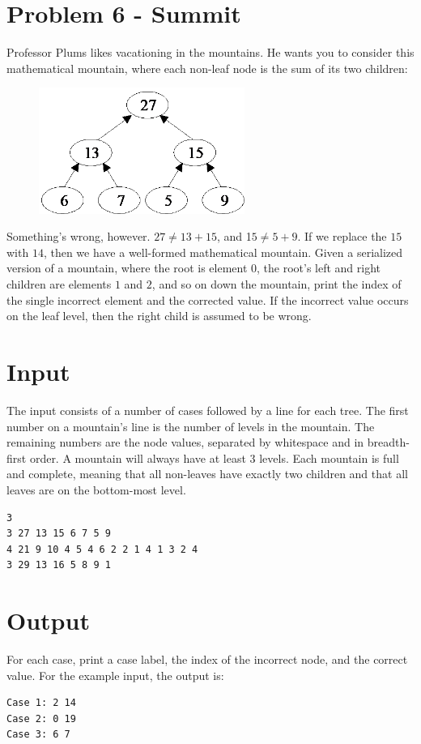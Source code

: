 \documentclass{article}
\begin{document}

\section*{Problem 6 - Summit}

Professor Plums likes vacationing in the mountains.  He wants you to consider this mathematical mountain, where each non-leaf node is the sum of its two children:

\begin{figure}[h]
\begin{center}
\includegraphics[width=0.6\textwidth]{problem6tree.png} 
\end{center}
\end{figure}

Something’s wrong, however. $27 \neq 13 + 15$, and 1$5 \neq 5 + 9$. If we replace the $15$ with $14$, then we have a well-formed mathematical mountain. Given a serialized version of a mountain, where the root is element $0$, the root’s left and right children are elements $1$ and $2$, and so on down the mountain, print the index of the single incorrect element and the corrected value.  If the incorrect value occurs on the leaf level, then the right child is assumed to be wrong.

\section*{Input}
The input consists of a number of cases followed by a line for each tree. The first number on a mountain’s line is the number of levels in the mountain. The remaining numbers are the node values, separated by whitespace and in breadth-first order. A mountain will always have at least $3$ levels. Each mountain is full and complete, meaning that all non-leaves have exactly two children and that all leaves are on the bottom-most level.
\begin{verbatim}
3 
3 27 13 15 6 7 5 9 
4 21 9 10 4 5 4 6 2 2 1 4 1 3 2 4 
3 29 13 16 5 8 9 1
\end{verbatim}

\section*{Output}
For each case, print a case label, the index of the incorrect node, and the correct value. For the example input, the output is:
\begin{verbatim}
Case 1: 2 14 
Case 2: 0 19 
Case 3: 6 7
\end{verbatim}
\end{document}
